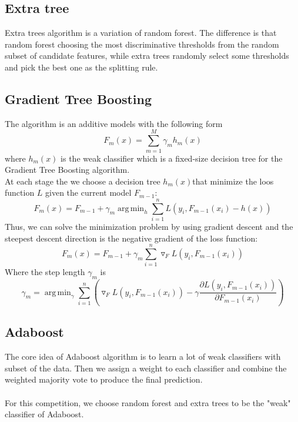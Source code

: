 \documentclass[conference]{IEEEtran}
\DeclareMathOperator*{\argmin}{arg\,min}
\begin{document}
\subsection{Extra tree}
Extra trees algorithm is a variation of random forest. The difference is that random forest choosing the most discriminative thresholds from the random subset of candidate features, while extra trees randomly select some thresholds and pick the best one as the splitting rule.

\subsection{Gradient Tree Boosting}
The algorithm is an additive models with the following form
\begin{equation}
F_m(x)=\sum_{m=1}^{M}\gamma_m h_m(x)
\end{equation}
where $h_m(x)$ is the weak classifier which is a fixed-size decision tree for the Gradient Tree Boosting algorithm. \\
At each stage the we choose a decision tree $h_m(x)$that minimize the loos function $L$ given the current model $F_{m-1}$:  
\begin{equation}
F_m(x)=F_{m-1}+\gamma_m \argmin_h\sum_{i=1}^n L(y_i,F_{m-1}(x_i)-h(x))
\end{equation}
\indent Thus, we can solve the minimization problem by using gradient descent and the steepest descent direction is the negative gradient of the loss function:
\begin{equation}
F_m(x)=F_{m-1}+\gamma_m \sum_{i=1}^n \triangledown_F L(y_i,F_{m-1}(x_i))
\end{equation}
Where the step length $\gamma_m$ is 
\begin{equation}
\gamma_m=\argmin_{\gamma}\sum_{i=1}^n(\triangledown_F L(y_i,F_{m-1}(x_i))-\gamma\frac{\partial L(y_i,F_{m-1}(x_i))}{\partial F_{m-1}(x_i)}) 
\end{equation}

\subsection{Adaboost}
The core idea of Adaboost algorithm is to learn a lot of weak classifiers with subset of the data. Then we assign a weight to each classifier and combine the weighted majority vote to produce the final prediction. \\ \\
For this competition, we choose random forest and extra trees to be the "weak" classifier of Adaboost. 
\end{document}
